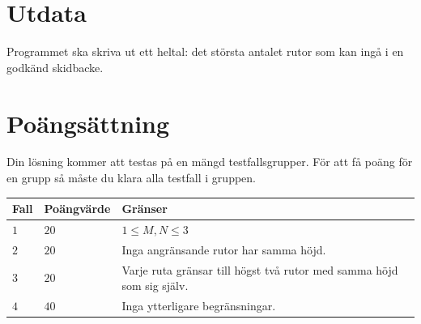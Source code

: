 \section*{Utdata}
Programmet ska skriva ut ett heltal: det största antalet rutor som kan ingå i en godkänd skidbacke.

\section*{Poängsättning}
Din lösning kommer att testas på en mängd testfallsgrupper.
För att få poäng för en grupp så måste du klara alla testfall i gruppen.

\noindent
\begin{tabular}{| l | l | l |}
  \hline
  Fall & Poängvärde & Gränser \\ \hline
  $1$    & $20$        &  $1 \leq M, N \leq 3$\\ \hline 
  $2$    & $20$        &  Inga angränsande rutor har samma höjd. \\ \hline 
  $3$    & $20$        &  Varje ruta gränsar till högst två rutor med samma höjd som sig själv. \\ \hline
  $4$    & $40$        &  Inga ytterligare begränsningar. \\ \hline
\end{tabular}

